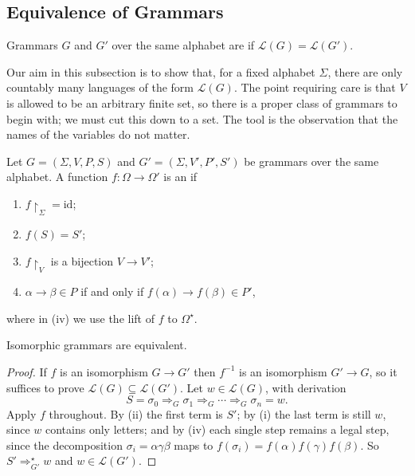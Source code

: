 \documentclass[a4paper]{scrartcl}
\newcommand{\lang}{\mathcal{L}}
\begin{document}
\subsection{Equivalence of Grammars}

\begin{definition}
	Grammars $G$ and $G'$ over the same alphabet are  if $\lang(G) = \lang(G')$.
\end{definition}

Our aim in this subsection is to show that, for a fixed alphabet $\Sigma$, there are only countably many languages of the form $\lang(G)$. The point requiring care is that $V$ is allowed to be an arbitrary finite set, so there is a proper class of grammars to begin with; we must cut this down to a set. The tool is the observation that the names of the variables do not matter.

\begin{definition}
	Let $G = (\Sigma, V, P, S)$ and $G' = (\Sigma, V', P', S')$ be grammars over the same alphabet. A function $f \colon \Omega \to \Omega'$ is an  if
	\begin{enumerate}[label=(\roman*)]
		\item $f\restriction_\Sigma = \mathrm{id}$;
		\item $f(S) = S'$;
		\item $f\restriction_V$ is a bijection $V \to V'$;
		\item $\alpha \to \beta \in P$ if and only if $f(\alpha) \to f(\beta) \in P'$,
	\end{enumerate}
	where in (iv) we use the lift of $f$ to $\Omega^\star$.
\end{definition}

\begin{proposition}
	Isomorphic grammars are equivalent.
\end{proposition}

\begin{proof}
	If $f$ is an isomorphism $G \to G'$ then $f^{-1}$ is an isomorphism $G' \to G$, so it suffices to prove $\lang(G) \subseteq \lang(G')$. Let $w \in \lang(G)$, with derivation
	$$S = \sigma_0 \Rightarrow_G \sigma_1 \Rightarrow_G \cdots \Rightarrow_G \sigma_n = w.$$
	Apply $f$ throughout. By (ii) the first term is $S'$; by (i) the last term is still $w$, since $w$ contains only letters; and by (iv) each single step remains a legal step, since the decomposition $\sigma_i = \alpha\gamma\beta$ maps to $f(\sigma_i) = f(\alpha)f(\gamma)f(\beta)$. So $S' \Rightarrow_{G'}^\star w$ and $w \in \lang(G')$.
\end{proof}
\end{document}
